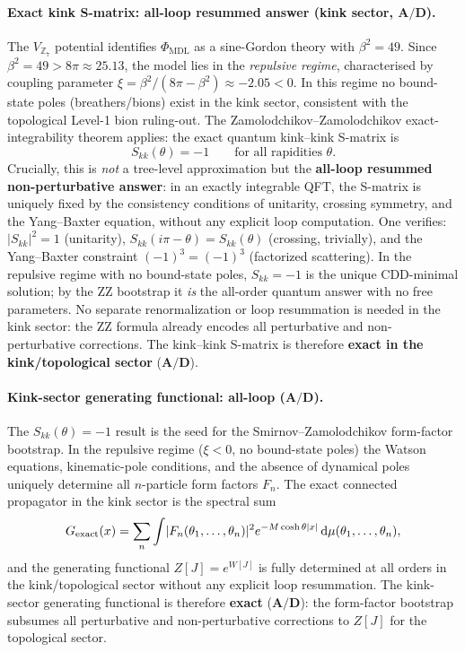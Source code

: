 \documentclass[11pt]{article}
\theoremstyle{remark}
\newcommand{\PHIMDL}{\Phi_{\mathrm{MDL}}}
\newcommand{\CatAD}{\textbf{A/D}}
\begin{document}
\paragraph{Exact kink S-matrix: all-loop resummed answer (kink sector, $\CatAD$).}
The $V_{\mathbb{Z}_7}$ potential identifies $\PHIMDL$ as a sine-Gordon theory with
$\beta^2 = 49$.  Since $\beta^2 = 49 > 8\pi \approx 25.13$, the model lies in the
\emph{repulsive regime}, characterised by coupling parameter
$\xi = \beta^2/(8\pi - \beta^2) \approx -2.05 < 0$.
In this regime no bound-state poles (breathers/bions) exist in the kink sector,
consistent with the topological Level-1 bion ruling-out.
The Zamolodchikov--Zamolodchikov exact-integrability theorem
\cite{ZamolodchikovZamolodchikov1979} applies: the exact quantum kink--kink
S-matrix is
\[
  S_{kk}(\theta) = -1 \qquad \text{for all rapidities } \theta.
\]
Crucially, this is \emph{not} a tree-level approximation but the
\textbf{all-loop resummed non-perturbative answer}: in an exactly integrable QFT,
the S-matrix is uniquely fixed by the consistency conditions of unitarity,
crossing symmetry, and the Yang--Baxter equation, without any explicit loop
computation.  One verifies: $|S_{kk}|^2 = 1$ (unitarity), $S_{kk}(i\pi - \theta)
= S_{kk}(\theta)$ (crossing, trivially), and the Yang--Baxter constraint
$(-1)^3 = (-1)^3$ (factorized scattering).  In the repulsive regime with no
bound-state poles, $S_{kk} = -1$ is the unique CDD-minimal solution; by the ZZ
bootstrap it \emph{is} the all-order quantum answer with no free parameters.
No separate renormalization or loop resummation is needed in the kink sector:
the ZZ formula already encodes all perturbative and non-perturbative corrections.
The kink--kink S-matrix is therefore \textbf{exact in the kink/topological sector}
($\CatAD$).

\paragraph{Kink-sector generating functional: all-loop ($\CatAD$).}
The $S_{kk}(\theta) = -1$ result is the seed for the Smirnov--Zamolodchikov form-factor
bootstrap.  In the repulsive regime ($\xi < 0$, no bound-state poles) the Watson equations,
kinematic-pole conditions, and the absence of dynamical poles uniquely determine all
$n$-particle form factors $F_n$.  The exact connected propagator in the kink sector is the
spectral sum
\[
  G_{\rm exact}(x) = \sum_n \int \lvert F_n(\theta_1,\ldots,\theta_n) \rvert^2
  e^{-M\cosh\theta \lvert x \rvert}\,\mathrm{d}\mu(\theta_1,\ldots,\theta_n),
\]
and the generating functional $Z[J] = e^{W[J]}$ is fully determined at all orders in the
kink/topological sector without any explicit loop resummation.  The kink-sector
generating functional is therefore \textbf{exact} ($\CatAD$): the form-factor
bootstrap subsumes all perturbative and non-perturbative corrections to $Z[J]$ for
the topological sector.
\end{document}
